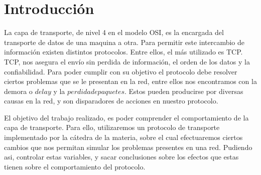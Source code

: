 \section{Introducci\'on}

La capa de transporte, de nivel 4 en el modelo OSI, es la encargada del transporte de datos de una maquina a otra. Para permitir este intercambio de informaci\'on existen distintos protocolos. Entre ellos, el m\'as utilizado es TCP.
TCP, nos asegura el env\'io sin perdida de informaci\'on, el orden de los datos y la confiabilidad.
Para poder cumplir con su objetivo el protocolo debe resolver ciertos problemas que se le presentan en la red, entre ellos nos encontramos con la demora o $delay$ y la $perdida de paquetes$. Estos pueden producirse por diversas causas en la red, y son disparadores de acciones en nuestro protocolo.

El objetivo del trabajo realizado, es poder comprender el comportamiento de la capa de transporte. Para ello, utilizaremos un protocolo de transporte implementado por la c\'atedra de la materia, sobre el cual efectuaremos ciertos cambios que nos permitan simular los problemas presentes en una red. Pudiendo asi, controlar estas variables, y sacar conclusiones sobre los efectos que estas tienen sobre el comportamiento del protocolo.
